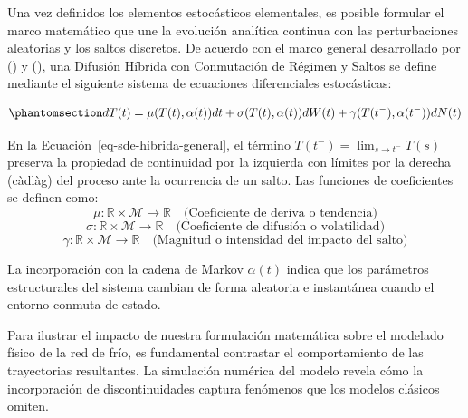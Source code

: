 \documentclass[
  spanish,
  letterpaper,
  DIV=11,
  numbers=noendperiod]{scrreprt}
\theoremstyle{plain}
\theoremstyle{definition}
\theoremstyle{remark}
\begin{document}
Una vez definidos los elementos estocásticos elementales, es posible
formular el marco matemático que une la evolución analítica continua con
las perturbaciones aleatorias y los saltos discretos. De acuerdo con el
marco general desarrollado por () y (), una Difusión Híbrida con Conmutación de Régimen y Saltos se
define mediante el siguiente sistema de ecuaciones diferenciales
estocásticas:

\begin{equation}\phantomsection\label{eq-sde-hibrida-general}{
dT(t) = \mu(T(t), \alpha(t)) dt + \sigma(T(t), \alpha(t)) dW(t) + \gamma(T(t^-), \alpha(t^-)) dN(t)
}\end{equation}

En la Ecuación~\ref{eq-sde-hibrida-general}, el término
\(T(t^-) = \lim_{s \to t^-} T(s)\) preserva la propiedad de continuidad
por la izquierda con límites por la derecha (càdlàg) del proceso ante la
ocurrencia de un salto. Las funciones de coeficientes se definen como:
\[\mu: \mathbb{R} \times \mathcal{M} \to \mathbb{R} \quad \text{(Coeficiente de deriva o tendencia)}\]
\[\sigma: \mathbb{R} \times \mathcal{M} \to \mathbb{R} \quad \text{(Coeficiente de difusión o volatilidad)}\]
\[\gamma: \mathbb{R} \times \mathcal{M} \to \mathbb{R} \quad \text{(Magnitud o intensidad del impacto del salto)}\]

La incorporación con la cadena de Markov \(\alpha(t)\) indica que los
parámetros estructurales del sistema cambian de forma aleatoria e
instantánea cuando el entorno conmuta de estado.

Para ilustrar el impacto de nuestra formulación matemática sobre el
modelado físico de la red de frío, es fundamental contrastar el
comportamiento de las trayectorias resultantes. La simulación numérica
del modelo revela cómo la incorporación de discontinuidades captura
fenómenos que los modelos clásicos omiten.
\end{document}
